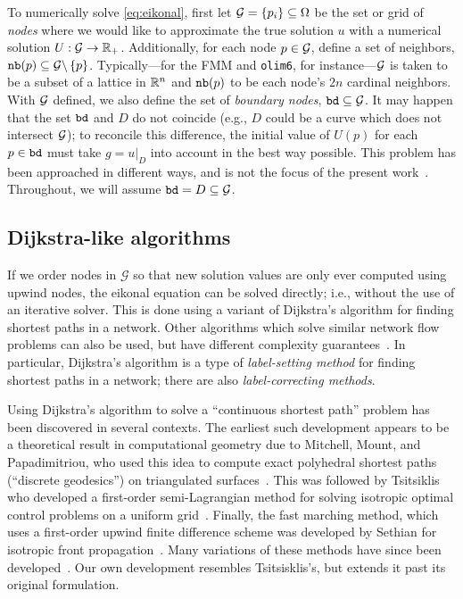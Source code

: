 \documentclass[eikonal.tex]{subfiles}
\begin{document}
To numerically solve \cref{eq:eikonal}, first let
$\mathcal{G} = \{p_i\} \subseteq \Omega$ be the set or grid of \emph{nodes}
where we would like to approximate the true solution $u$ with a
numerical solution $U : \mathcal{G} \to \mathbb{R}_+$. Additionally, for each node
$p \in \mathcal{G}$, define a set of neighbors,
$\texttt{nb}(p) \subseteq \mathcal{G} \backslash \left\{p\right\}$. Typically---for the FMM
and \texttt{olim6}, for instance---$\mathcal{G}$ is taken to be a subset of
a lattice in $\mathbb{R}^n$ and $\texttt{nb}(p)$ to be each node's $2n$ cardinal
neighbors. With $\mathcal{G}$ defined, we also define the set of
\emph{boundary nodes}, $\texttt{bd} \subseteq \mathcal{G}$. It may happen that
the set $\texttt{bd}$ and $D$ do not coincide (e.g., $D$ could be a
curve which does not intersect $\mathcal{G}$); to reconcile this difference,
the initial value of $U(p)$ for each $p \in \texttt{bd}$ must take
$g = \left. u \right|_D$ into account in the best way possible. This
problem has been approached in different ways, and is not the focus of
the present work~\cite{chopp2001some}. Throughout, we will assume
$\texttt{bd} = D \subseteq \mathcal{G}$.

\subsection{Dijkstra-like algorithms}\label{ssec:dijkstra-like}
If we order nodes in $\mathcal{G}$ so that new solution values are
only ever computed using upwind nodes, the eikonal equation can be
solved directly; i.e., without the use of an iterative solver. This is
done using a variant of Dijkstra's algorithm for finding shortest
paths in a network. Other algorithms which solve similar network flow
problems can also be used, but have different complexity
guarantees~\cite{chacon2012fast}. In particular, Dijkstra's algorithm
is a type of \emph{label-setting method} for finding shortest paths in
a network; there are also \emph{label-correcting methods}.

Using Dijkstra's algorithm to solve a ``continuous shortest path''
problem has been discovered in several contexts. The earliest such
development appears to be a theoretical result in computational
geometry due to Mitchell, Mount, and Papadimitriou, who used this idea
to compute exact polyhedral shortest paths (``discrete geodesics'') on
triangulated surfaces~\cite{mitchell1987discrete}. This was followed
by Tsitsiklis who developed a first-order semi-Lagrangian method for
solving isotropic optimal control problems on a uniform
grid~\cite{tsitsiklis1995efficient}. Finally, the fast marching
method, which uses a first-order upwind finite difference scheme was
developed by Sethian for isotropic front
propagation~\cite{sethian1996fast}. Many variations of these methods
have since been developed~\cite{sethian2003ordered,kao2004lax}. Our
own development resembles Tsitsisklis's, but extends it past its
original formulation.
\end{document}
